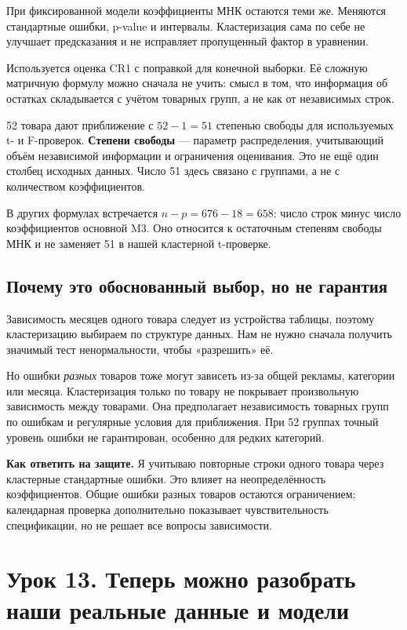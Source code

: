 \documentclass[12pt,a4paper]{article}
\newcommand{\answer}[1]{\par\textbf{Как ответить на защите.} #1\par}
\begin{document}
При фиксированной модели коэффициенты МНК остаются теми же. Меняются стандартные ошибки, p-value и интервалы. Кластеризация сама по себе не улучшает предсказания и не исправляет пропущенный фактор в уравнении.

Используется оценка CR1 с поправкой для конечной выборки. Её сложную матричную формулу можно сначала не учить: смысл в том, что информация об остатках складывается с учётом товарных групп, а не как от независимых строк.

52 товара дают приближение с $52-1=51$ степенью свободы для используемых t- и F-проверок. \textbf{Степени свободы} --- параметр распределения, учитывающий объём независимой информации и ограничения оценивания. Это не ещё один столбец исходных данных. Число 51 здесь связано с группами, а не с количеством коэффициентов.

В других формулах встречается $n-p=676-18=658$: число строк минус число коэффициентов основной M3. Оно относится к остаточным степеням свободы МНК и не заменяет 51 в нашей кластерной t-проверке.

\subsection{Почему это обоснованный выбор, но не гарантия}

Зависимость месяцев одного товара следует из устройства таблицы, поэтому кластеризацию выбираем по структуре данных. Нам не нужно сначала получить значимый тест ненормальности, чтобы «разрешить» её.

Но ошибки \emph{разных} товаров тоже могут зависеть из-за общей рекламы, категории или месяца. Кластеризация только по товару не покрывает произвольную зависимость между товарами. Она предполагает независимость товарных групп по ошибкам и регулярные условия для приближения. При 52 группах точный уровень ошибки не гарантирован, особенно для редких категорий.

\answer{Я учитываю повторные строки одного товара через кластерные стандартные ошибки. Это влияет на неопределённость коэффициентов. Общие ошибки разных товаров остаются ограничением; календарная проверка дополнительно показывает чувствительность спецификации, но не решает все вопросы зависимости.}

\section{Урок 13. Теперь можно разобрать наши реальные данные и модели}
\end{document}
